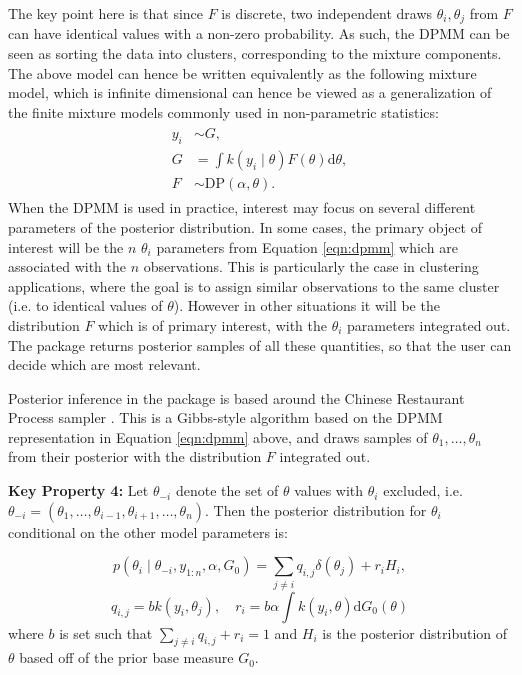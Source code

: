 \documentclass[nojss]{jss}
\begin{document}
The key point here is that since $F$ is discrete, two independent draws $\theta_i, \theta_j$ from $F$  can have identical values with a non-zero probability. As such, the DPMM can be seen as sorting the data into clusters, corresponding to the mixture components. The above model can hence be written equivalently as the following mixture model, which is infinite dimensional can hence be viewed as a generalization of the finite mixture models commonly used in non-parametric statistics:
\begin{align}
\begin{split}
y_i &\sim G, \\
G & = \int k(y_i \mid \theta) F(\theta) \mathrm{d} \theta ,\\
F &\sim \text{DP} (\alpha,\theta).
\end{split}
\label{eqn:dp2}
\end{align}
When the DPMM is used in practice, interest may focus on several different parameters of the posterior distribution. In some cases, the primary object of interest will be the $n$ ${\theta_i}$ parameters from Equation \ref{eqn:dpmm} which are associated with the $n$ observations. This is particularly the case in clustering applications, where the goal is to assign similar observations to the same cluster (i.e. to identical values of $\theta$). However in other situations it will be the distribution $F$ which is of primary interest, with the ${\theta_i}$ parameters integrated out. The  package returns posterior samples of all these quantities, so that the user can decide which are most relevant.

Posterior inference in the  package is based around the Chinese Restaurant Process sampler \citep{neal_markov_2000}. This is a Gibbs-style algorithm based on the DPMM representation in Equation \ref{eqn:dpmm} above, and draws samples of $\theta_1,\ldots,\theta_n$ from their posterior with the distribution $F$ integrated out.

\begin{tcolorbox}
\textbf{Key Property 4:}  Let $\theta_{-i}$ denote the set of $\theta$ values with $\theta_i$ excluded, i.e. $\theta_{-i} = (\theta_1,\ldots,\theta_{i-1},\theta_{i+1},\ldots,\theta_n)$. Then the posterior distribution for $\theta_i$ conditional on the other model parameters is:

$$p(\theta_i \mid \theta_{-i}, y_{1:n},\alpha,G_0) = \sum _{j \neq i} q_{i,j} \delta (\theta_j ) + r_i H_i,$$
$$q_{i,j} = b k(y_i , \theta _j),  \quad r_i = b \alpha \int k(y_i , \theta) \mathrm{d} G_0 ( \theta )$$
where $b$ is set such that $\sum _{j \neq i } q_{i,j} + r_i = 1$ and $H_i$ is the posterior distribution of $\theta$ based off of the prior base measure $G_0$.
\end{tcolorbox}
\end{document}
